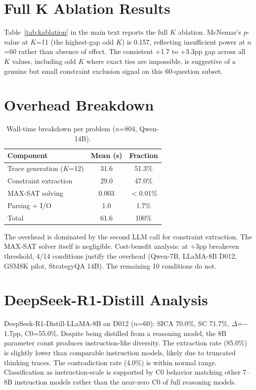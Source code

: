 \documentclass[11pt,a4paper]{article}
\begin{document}
\section{Full K Ablation Results}
\label{app:kablation}

Table~\ref{tab:kablation} in the main text reports the full $K$ ablation. McNemar's $p$-value at $K$=11 (the highest-gap odd $K$) is 0.157, reflecting insufficient power at $n$=60 rather than absence of effect. The consistent +1.7 to +3.3pp gap across all $K$ values, including odd $K$ where exact ties are impossible, is suggestive of a genuine but small constraint exclusion signal on this 60-question subset.

\section{Overhead Breakdown}
\label{app:overhead}

\begin{table}[h]
\centering
\caption{Wall-time breakdown per problem ($n$=804, Qwen-14B).}
\label{tab:overhead_detail}
\small
\begin{tabular}{lcc}
\toprule
\textbf{Component} & \textbf{Mean (s)} & \textbf{Fraction} \\
\midrule
Trace generation ($K$=12) & 31.6 & 51.3\% \\
Constraint extraction & 29.0 & 47.0\% \\
MAX-SAT solving & 0.003 & $<$0.01\% \\
Parsing + I/O & 1.0 & 1.7\% \\
\midrule
Total & 61.6 & 100\% \\
\bottomrule
\end{tabular}
\end{table}

The overhead is dominated by the second LLM call for constraint extraction. The MAX-SAT solver itself is negligible. Cost-benefit analysis: at +3pp breakeven threshold, 4/14 conditions justify the overhead (Qwen-7B, LLaMA-8B D012, GSM8K pilot, StrategyQA 14B). The remaining 10 conditions do not.

\section{DeepSeek-R1-Distill Analysis}
\label{app:deepseek}

DeepSeek-R1-Distill-LLaMA-8B on D012 ($n$=60): SICA 70.0\%, SC 71.7\%, $\Delta$=$-$1.7pp, C0=55.0\%. Despite being distilled from a reasoning model, the 8B parameter count produces instruction-like diversity. The extraction rate (85.0\%) is slightly lower than comparable instruction models, likely due to truncated thinking traces. The contradiction rate (4.0\%) is within normal range. Classification as instruction-scale is supported by C0 behavior matching other 7--8B instruction models rather than the near-zero C0 of full reasoning models.
\end{document}
